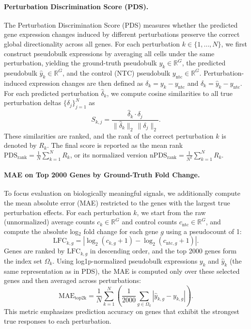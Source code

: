 \documentclass{article}
\begin{document}
\paragraph{Perturbation Discrimination Score (PDS).}
The Perturbation Discrimination Score (PDS) measures whether the predicted gene expression changes induced by different perturbations preserve the correct global directionality across all genes. For each perturbation $k \in \{1,\dots,N\}$, we first construct pseudobulk expressions by averaging all cells under the same perturbation, yielding the ground-truth pseudobulk $y_k \in \mathbb{R}^G$, the predicted pseudobulk $\hat y_k \in \mathbb{R}^G$, and the control (NTC) pseudobulk $y_{\mathrm{ntc}} \in \mathbb{R}^G$. Perturbation-induced expression changes are then defined as $\delta_k = y_k - y_{\mathrm{ntc}}$ and $\hat\delta_k = \hat y_k - y_{\mathrm{ntc}}$. For each predicted perturbation $\hat\delta_k$, we compute cosine similarities to all true perturbation deltas $\{\delta_j\}_{j=1}^N$ as
\[
S_{k,j} = \frac{\hat\delta_k \cdot \delta_j}{\|\hat\delta_k\|_2 \, \|\delta_j\|_2}.
\]
These similarities are ranked, and the rank of the correct perturbation $k$ is denoted by $R_k$. The final score is reported as the mean rank $\mathrm{PDS}_{\mathrm{rank}} = \frac{1}{N}\sum_{k=1}^N R_k$, or its normalized version $\mathrm{nPDS}_{\mathrm{rank}} = \frac{1}{N^2}\sum_{k=1}^N R_k$.

\paragraph{MAE on Top 2000 Genes by Ground-Truth Fold Change.}
To focus evaluation on biologically meaningful signals, we additionally compute the mean absolute error (MAE) restricted to the genes with the largest true perturbation effects. For each perturbation $k$, we start from the raw (unnormalized) average counts $c_k \in \mathbb{R}^G$ and control counts $c_{\mathrm{ntc}} \in \mathbb{R}^G$, and compute the absolute log$_2$ fold change for each gene $g$ using a pseudocount of 1:
\[
\mathrm{LFC}_{k,g} = \left|\log_2(c_{k,g} + 1) - \log_2(c_{\mathrm{ntc},g} + 1)\right|.
\]
Genes are ranked by $\mathrm{LFC}_{k,g}$ in descending order, and the top 2000 genes form the index set $\Omega_k$. Using log1p-normalized pseudobulk expressions $y_k$ and $\hat y_k$ (the same representation as in PDS), the MAE is computed only over these selected genes and then averaged across perturbations:
\[
\mathrm{MAE}_{\mathrm{top2k}}
=
\frac{1}{N}
\sum_{k=1}^N
\left(
\frac{1}{2000}
\sum_{g \in \Omega_k}
\left|\hat y_{k,g} - y_{k,g}\right|
\right).
\]
This metric emphasizes prediction accuracy on genes that exhibit the strongest true responses to each perturbation.
\end{document}
